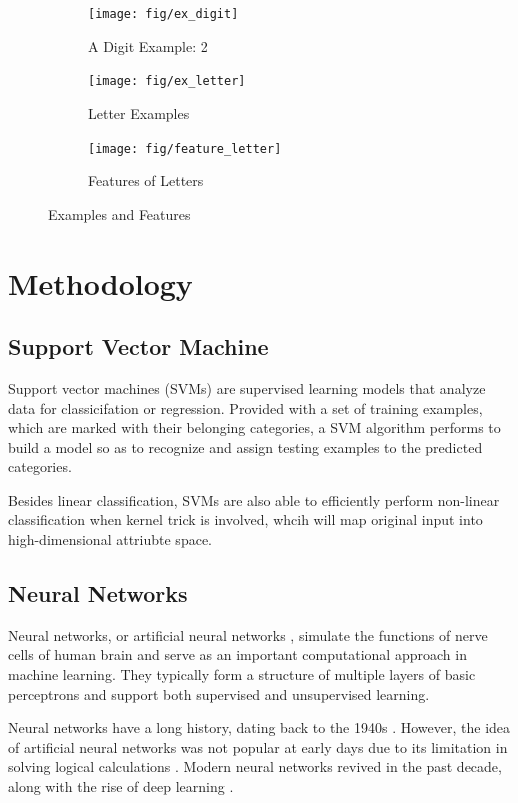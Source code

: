 \documentclass[11pt]{article}
\begin{document}
\begin{figure}[htbp]
\centering

\begin{subfigure}[htbp]{0.32\columnwidth}
\texttt{[image: fig/ex\_digit]}
\caption{A Digit Example: 2}
\label{fig:ex:digit}
\end{subfigure}
\hfill
\begin{subfigure}[htbp]{0.32\columnwidth}
\texttt{[image: fig/ex\_letter]}
\caption{Letter Examples}
\label{fig:ex:letter}
\end{subfigure}
\hfill
\begin{subfigure}[htbp]{0.32\columnwidth}
\texttt{[image: fig/feature\_letter]}
\caption{Features of Letters}
\label{fig:feature:letter}
\end{subfigure}
\caption{Examples and Features}
\end{figure}

\section{Methodology}\label{sec:metho}

\subsection{Support Vector Machine}
Support vector machines (SVMs) \cite{cortes1995support} are supervised learning models that analyze data for classicifation or regression. Provided with a set of training examples, which are marked with their belonging categories, a SVM algorithm performs to build a model so as to recognize and assign testing examples to the predicted categories. 

Besides linear classification, SVMs are also able to efficiently perform non-linear classification when kernel trick is involved, whcih will map original input into high-dimensional attriubte space.

\subsection{Neural Networks}
Neural networks, or artificial neural networks \cite{hagan1996neural}, simulate the functions of nerve cells of human brain and serve as an important computational approach in machine learning. They typically form a structure of multiple layers of basic perceptrons and support both supervised and unsupervised learning.

Neural networks have a long history, dating back to the 1940s \cite{mcculloch1943logical}. However, the idea of artificial neural networks was not popular at early days due to its limitation in solving logical calculations \cite{minsky1988perceptrons}. Modern neural networks revived in the past decade, along with the rise of deep learning \cite{bengio2009learning, schmidhuber2015deep}.
\end{document}

